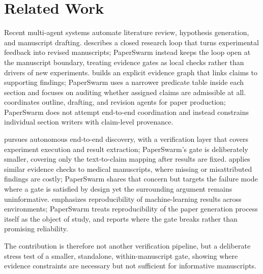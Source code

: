 \section{Related Work}

Recent multi-agent systems automate literature review, hypothesis generation, and manuscript drafting. \citet{xia2026researchloop} describes a closed research loop that turns experimental feedback into revised manuscripts; PaperSwarm instead keeps the loop open at the manuscript boundary, treating evidence gates as local checks rather than drivers of new experiments. \citet{ren2026evigraph} builds an explicit evidence graph that links claims to supporting findings; PaperSwarm uses a narrower predicate table inside each section and focuses on auditing whether assigned claims are admissible at all. \citet{jha2026paperpilot} coordinates outline, drafting, and revision agents for paper production; PaperSwarm does not attempt end-to-end coordination and instead constrains individual section writers with claim-level provenance.

\citet{luo2026xscientist} pursues autonomous end-to-end discovery, with a verification layer that covers experiment execution and result extraction; PaperSwarm's gate is deliberately smaller, covering only the text-to-claim mapping after results are fixed. \citet{nam2026medsci} applies similar evidence checks to medical manuscripts, where missing or misattributed findings are costly; PaperSwarm shares that concern but targets the failure mode where a gate is satisfied by design yet the surrounding argument remains uninformative. \citet{gaddipati2026mlreplicate} emphasizes reproducibility of machine-learning results across environments; PaperSwarm treats reproducibility of the paper generation process itself as the object of study, and reports where the gate breaks rather than promising reliability.

The contribution is therefore not another verification pipeline, but a deliberate stress test of a smaller, standalone, within-manuscript gate, showing where evidence constraints are necessary but not sufficient for informative manuscripts.
